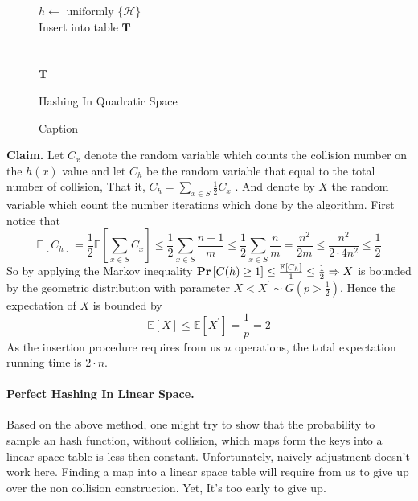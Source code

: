 \begin{figure}[h!]
    \centering
    \begin{algorithm}[H]
        \SetAlgoLined
         \(h \leftarrow \text{ uniformly } \{ \mathcal{H} \} \) \\
         Insert  into table \(\mathbf{T}\)
         \ \\ 
         \ \\ 
         \ \\
         \Return \(\mathbf{T}\) 
         \caption{Hashing In Quadratic Space}
    \end{algorithm}
    \caption{Caption}
    \label{fig:my_label2}
\end{figure}
\textbf{Claim.} Let \(C_{x}\) denote the random variable which counts the collision number on the \(h(x)\) value and let \(C_{h}\) be the random variable that equal to the total number of collision, That it, \( C_{h} = \sum_{x\in S}{\frac{1}{2}C_{x}}\) . And denote by \(X\) the random variable which count the number iterations which done by the algorithm. First notice that \begin{equation*}
    \mathbb{E}\left[C_h\right]=\frac{1}{2}\mathbb{E}\left[\sum_{x\in S}{C_x}\right]\le \frac{1}{2}\sum_{x\in S}{\frac{n-1}{m}} \le \frac{1}{2}\sum_{x\in S}{\frac{n}{m}} = \frac{n^{2}}{2m} \le \frac{n^{2}}{2\cdot 4n^{2}} \le \frac{1}{2}
\end{equation*}    
So by applying the Markov inequality \( \mathbf{Pr} \left[ { C(h) \ge 1} \right]\le \frac{\mathbb{E}\left[C_h\right]}{1} \le \frac{1}{2} \Rightarrow X \) is bounded by the geometric distribution with parameter \( X<X^{\prime} \sim G\left( p > \frac{1}{2}\right) \). Hence the expectation of \(X\) is bounded by \begin{equation*} \mathbb{E} \left[  X\right] \le \mathbb{E} \left[  X^{\prime}\right] = \frac{1}{p} = 2 \end{equation*}As the insertion procedure requires from us \(n\) operations, the total expectation running time is \(2\cdot n\).    
\paragraph{Perfect Hashing In Linear Space.} Based on the above method, one might try to show that the probability to sample an hash function, without collision, which maps form the keys into a linear space table is less then constant. Unfortunately, naively adjustment doesn't work here. Finding a map into a linear space table will require from us to give up over the non collision construction. Yet, It's too early to give up. 

